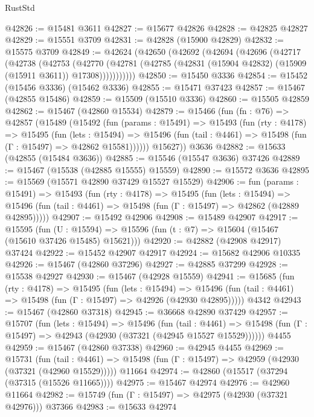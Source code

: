\begin{lexlean}{RustStd}
\begin{coremodule}
@42826 := @15481 @3611
@42827 := @15677 @42826
@42828 := @42825 @42827
@42829 := @15551 @3709
@42831 := @42828 (@15900 @42829)
@42832 := @15575 @3709
@42849 := @42624
    (@42650
      (@42692
        (@42694
          (@42696
            (@42717
              (@42738
                (@42753
                  (@42770
                    (@42781
                      (@42785 (@42831 (@15904 @42832) (@15909 (@15911 @3611)) @17308)))))))))))
@42850 := @15450 @3336
@42854 := @15452 (@15456 @3336) (@15462 @3336)
@42855 := @15471 @37423
@42857 := @15467 (@42855 @15486)
@42859 := @15509 (@15510 @3336)
@42860 := @15505 @42859
@42862 := @15467 (@42860 @15534)
@42879 := @15466
    (fun (fn : @76) =>
    @42857
      (@15489
        (@15492
          (fun (params : @15491) =>
          @15493
            (fun (rty : @4178) =>
            @15495
              (fun (lets : @15494) =>
              @15496 (fun (tail : @4461) => @15498 (fun (Γ : @15497) => @42862 @15581))))))
        @15627))
    @3636
@42882 := @15633 (@42855 (@15484 @3636))
@42885 := @15546 (@15547 @3636) @37426
@42889 := @15467 (@15538 (@42885 @15555) @15559)
@42890 := @15572 @3636
@42895 := @15569 (@15571 @42890 @37429 @15527 @15529)
@42906 := fun (params : @15491) =>
  @15493
    (fun (rty : @4178) =>
    @15495
      (fun (lets : @15494) =>
      @15496 (fun (tail : @4461) => @15498 (fun (Γ : @15497) => @42862 (@42889 @42895)))))
@42907 := @15492 @42906
@42908 := @15489 @42907
@42917 := @15595
    (fun (U : @15594) => @15596 (fun (t : @7) => @15604 (@15467 (@15610 @37426 @15485) @15621)))
@42920 := @42882 (@42908 @42917) @37424
@42922 := @15452 @42907 @42917
@42924 := @15682 @42906 @10335
@42926 := @15467 (@42860 @37296)
@42927 := @42885 @37299
@42928 := @15538 @42927
@42930 := @15467 (@42928 @15559)
@42941 := @15685
    (fun (rty : @4178) =>
    @15495
      (fun (lets : @15494) =>
      @15496 (fun (tail : @4461) => @15498 (fun (Γ : @15497) => @42926 (@42930 @42895)))))
    @4342
@42943 := @15467 (@42860 @37318)
@42945 := @36668 @42890 @37429
@42957 := @15707
    (fun (lets : @15494) =>
    @15496
      (fun (tail : @4461) =>
      @15498 (fun (Γ : @15497) => @42943 (@42930 (@37321 (@42945 @15527 @15529))))))
    @4455
@42959 := @15467 (@42860 @37338)
@42960 := @42945 @4455
@42969 := @15731
    (fun (tail : @4461) => @15498 (fun (Γ : @15497) => @42959 (@42930 (@37321 (@42960 @15529)))))
    @11664
@42974 := @42860 (@15517 (@37294 (@37315 (@15526 @11665))))
@42975 := @15467 @42974
@42976 := @42960 @11664
@42982 := @15749 (fun (Γ : @15497) => @42975 (@42930 (@37321 @42976))) @37366
@42983 := @15633 @42974

\end{coremodule}
\end{lexlean}
